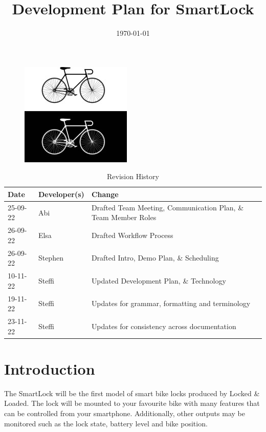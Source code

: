 \documentclass{article}
\title{Development Plan for SmartLock\\\progname}
\author{\authname}
\date{\today}
\begin{document}
\maketitle
\thispagestyle{empty}
\begin{figure}[h!]
  \centering
  \includegraphics[width=0.4\linewidth]{../BikeLogo.jpg}
\end{figure}

\newpage
{}
\begin{table}[hp]
\caption{Revision History} \label{TblRevisionHistory}
\begin{tabularx}{\textwidth}{llX}
\toprule
\textbf{Date} & \textbf{Developer(s)} & \textbf{Change}\\
\midrule
25-09-22 & Abi & Drafted Team Meeting, Communication Plan, \& Team Member Roles\\
26-09-22 & Elsa & Drafted Workflow Process\\
26-09-22 & Stephen & Drafted Intro, Demo Plan, \& Scheduling\\
10-11-22 & Steffi & Updated Development Plan, \& Technology\\
19-11-22 & Steffi & Updates for grammar, formatting and terminology\\
23-11-22 & Steffi & Updates for consistency across documentation\\
\bottomrule

\end{tabularx}
\end{table}

\newpage
\tableofcontents

\newpage
{}
\section{Introduction}

The SmartLock will be the first model of smart bike locks produced by Locked \& Loaded. The lock will be mounted to your favourite bike with many features that can be controlled from your smartphone. Additionally, other outputs may be monitored such as the lock state, battery level and bike position.
\end{document}
